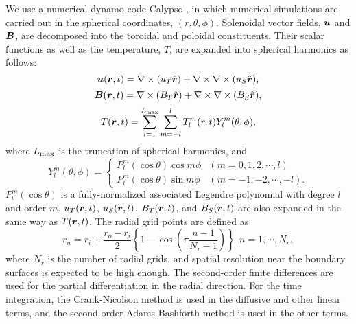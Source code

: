 {\color{red} %
We use a numerical dynamo code Calypso \cite{Matsui:2014}, in which numerical simulations are carried out in the spherical coordinates, $(r, \theta, \phi)$.
Solenoidal vector fields, $\mbox{\boldmath$u$}$ and $\mbox{\boldmath$B$}$, are decomposed into the toroidal and poloidal constituents.
Their scalar functions as well as the temperature, $T$, are expanded into spherical harmonics as follows:
%
\begin{equation}
\mbox{\boldmath$u$}(\mbox{\boldmath$r$}, t) = \nabla \times (u_T \hat{\mbox{\boldmath$r$}} ) + \nabla \times \nabla \times (u_S \hat{\mbox{\boldmath$r$}} ) ,
\label{eq:u_uT_uS}
\end{equation}
%
\begin{equation}
\mbox{\boldmath$B$}(\mbox{\boldmath$r$}, t) = \nabla \times (B_T \hat{\mbox{\boldmath$r$}} ) + \nabla \times \nabla \times (B_S \hat{\mbox{\boldmath$r$}} ) ,
\label{eq:B_BT_BS}
\end{equation}
%
\begin{equation}
T (\mbox{\boldmath$r$}, t) = \sum_{l = 1}^{L_{\rm max}} \sum_{m=-l}^{l} T_l^m(r, t) Y_l^m (\theta, \phi) ,
\label{eq:T_Ylm}
\end{equation}
%
where
$L_{\rm max}$ is the truncation of spherical harmonics, and
\begin{equation}
Y_l^m (\theta, \phi) = \left\{
 \begin{array}{ll}
 P_l^m(\cos\theta)\cos m\phi & (m = 0, 1, 2, \cdots, l)
 \\
 P_l^m(\cos\theta)\sin m\phi & (m = -1, -2, \cdots, -l) .
 \end{array}
\right.
\label{eq:def_of_Ylm}
\end{equation}
%
$P_l^m(\cos\theta)$ is a fully-normalized associated Legendre polynomial with degree $l$ and order $m$.
$u_T(\mbox{\boldmath$r$}, t)$, $u_S(\mbox{\boldmath$r$}, t)$, $B_T(\mbox{\boldmath$r$}, t)$, and $B_S(\mbox{\boldmath$r$}, t)$ are also expanded in the same way as $T(\mbox{\boldmath$r$}, t)$.
The radial grid points are defined as
%
\begin{equation}
r_n = r_i + \frac{r_o - r_i}{2} \left\{ 1 - \cos \left( \pi \frac{n-1}{N_r-1} \right) \right\} ~~ n = 1, \cdots , N_r ,
\label{eq:def_of_rn}
\end{equation}
%
where $N_r$ is the number of radial grids, and spatial resolution near the boundary surfaces is expected to be high enough.
The second-order finite differences are used for the partial differentiation in the radial direction.
For the time integration, the Crank-Nicolson method is used in the diffusive and other linear terms, and the second order Adams-Bashforth method is used in the other terms.
}%

